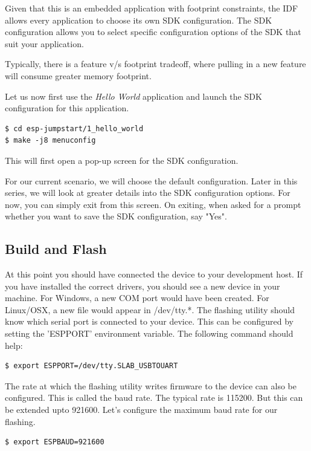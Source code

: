 \documentclass[main.tex]{subfiles}
\begin{document}
Given that this is an embedded application with footprint constraints, the IDF allows every application to choose its own SDK configuration. The SDK configuration allows you to select specific configuration options of the SDK that suit your application.

Typically, there is a feature v/s footprint tradeoff, where pulling in a new feature will consume greater memory footprint.

Let us now first use the \textit{Hello World} application and launch the SDK configuration for this application.

\begin{verbatim}
$ cd esp-jumpstart/1_hello_world
$ make -j8 menuconfig
\end{verbatim}

This will first open a pop-up screen for the SDK configuration.

For our current scenario, we will choose the default configuration. Later in this series, we will look at greater details into the SDK configuration options. For now, you can simply exit from this screen. On exiting, when asked for a prompt whether you want to save the SDK configuration, say "Yes".


\subsection{Build and Flash}
At this point you should have connected the device to your development host. If you have installed the correct drivers, you should see a new device in your machine. For Windows, a new COM port would have been created. For Linux/OSX, a new file would appear in /dev/tty.*. The flashing utility should know which serial port is connected to your device. This can be configured by setting the 'ESPPORT' environment variable. The following command should help:
\begin{verbatim}
$ export ESPPORT=/dev/tty.SLAB_USBTOUART
\end{verbatim}

The rate at which the flashing utility writes firmware to the device can also be configured. This is called the baud rate. The typical rate is 115200. But this can be extended upto 921600. Let's configure the maximum baud rate for our flashing.
\begin{verbatim}
$ export ESPBAUD=921600
\end{verbatim}
\end{document}
